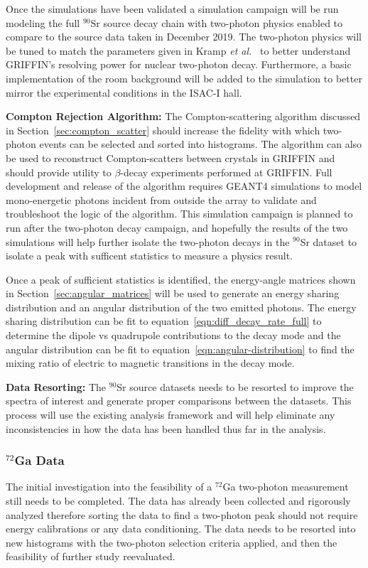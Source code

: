 \documentclass[cnatzke_thesis_proposal.tex]{subfiles}
\begin{document}
Once the simulations have been validated a simulation campaign will be run modeling the full $^{90}$Sr source decay chain with two-photon physics enabled to compare to the source data taken in December 2019. 
The two-photon physics will be tuned to match the parameters given in Kramp \textit{et al.}~\cite{kramp_nuclear_1987} to better understand GRIFFIN's resolving power for nuclear two-photon decay. 
Furthermore, a basic implementation of the room background will be added to the simulation to better mirror the experimental conditions in the ISAC-I hall. 

\textbf{Compton Rejection Algorithm:} The Compton-scattering algorithm discussed in Section~\ref{sec:compton_scatter} should increase the fidelity with which two-photon events can be selected and sorted into histograms. 
The algorithm can also be used to reconstruct Compton-scatters between crystals in GRIFFIN and should provide utility to $\beta$-decay experiments performed at GRIFFIN. 
Full development and release of the algorithm requires GEANT4 simulations to model mono-energetic photons incident from outside the array to validate and troubleshoot the logic of the algorithm.
This simulation campaign is planned to run after the two-photon decay campaign, and hopefully the results of the two simulations will help further isolate the two-photon decays in the $^{90}$Sr dataset to isolate a peak with sufficent statistics to measure a physics result. 

Once a peak of sufficient statistics is identified, the energy-angle matrices shown in Section~\ref{sec:angular_matrices} will be used to generate an energy sharing distribution and an angular distribution of the two emitted photons.
The energy sharing distribution can be fit to equation~\ref{eqn:diff_decay_rate_full} to determine the dipole vs quadrupole contributions to the decay mode and the angular distribution can be fit to equation~\ref{eqn:angular-distribution} to find the mixing ratio of electric to magnetic transitions in the decay mode. 

\textbf{Data Resorting:} The $^{90}$Sr source datasets needs to be resorted to improve the spectra of interest and generate proper comparisons between the datasets. 
This process will use the existing analysis framework and will help eliminate any inconsistencies in how the data has been handled thus far in the analysis. 

\subsubsection{$^{72}$Ga Data}
The initial investigation into the feasibility of a $^{72}$Ga two-photon measurement still needs to be completed. 
The data has already been collected and rigorously analyzed therefore sorting the data to find a two-photon peak should not require energy calibrations or any data conditioning.
The data needs to be resorted into new histograms with the two-photon selection criteria applied, and then the feasibility of further study reevaluated. 

\end{document}
